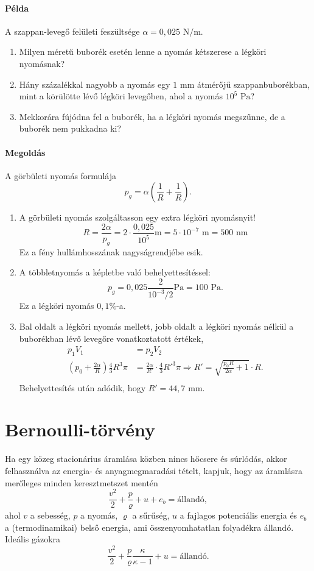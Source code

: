 \documentclass[12pt,a4paper]{scrartcl}
\begin{document}
\paragraph{Példa}
A szappan-levegő felületi feszültsége $\alpha = 0{,}025\text{ N}/\text{m}$. 
\begin{enumerate}
\item  Milyen méretű buborék esetén lenne a nyomás kétszerese a légköri nyomásnak? 
\item Hány százalékkal nagyobb a nyomás egy $1\text{ mm}$ átmérőjű szappanbuborékban, mint a körülötte lévő légköri levegőben, ahol a nyomás $10^5\text{ Pa}$?
\item Mekkorára fújódna fel a buborék, ha a légköri nyomás megszűnne, de a buborék nem pukkadna ki?
\end{enumerate}

\paragraph{Megoldás}
A görbületi nyomás formulája
\[{p_g} = \alpha \left( {\frac{1}{R} + \frac{1}{R}} \right).\]
\begin{enumerate}
\item A görbületi nyomás szolgáltasson egy extra légköri nyomásnyit!
\[R = \frac{{2\alpha }}{p_g} = 2 \cdot \frac{{0{,}025}}{{{{10}^5}}}{\text{m}} = 5 \cdot {10^{ - 7}}{\text{ m}} = 500{\text{ nm}}\]
Ez a fény hullámhosszának nagyságrendjébe esik.
\item A többletnyomás a képletbe való behelyettesítéssel:
\[{p_g} = 0{,}025\frac{2}{{{{10}^{ - 3}}/2}}{\text{Pa}} = 100{\text{ Pa}}.\]
Ez a légköri nyomás $0{,}1\%$-a.
\item Bal oldalt a légköri nyomás mellett, jobb oldalt a légköri nyomás nélkül a buborékban lévő levegőre vonatkoztatott értékek, 
\[\begin{aligned}
  {p_1}{V_1} &  = {p_2}{V_2} \\ 
  \left( {{p_0} + \frac{{2\alpha }}{R}} \right)\frac{4}{3}{R^3}\pi  &  = \frac{{2\alpha }}{{R'}} \cdot \frac{4}{3}R{'^3}\pi  \Rightarrow R' = \sqrt {\frac{{{p_0}R}}{{2\alpha }} + 1}  \cdot R. \\ 
\end{aligned} \]
Behelyettesítés után adódik, hogy $R' = 44{,}7{\text{ mm}}$.
\end{enumerate}
\normalsize

\section{Bernoulli-törvény}
Ha egy közeg stacionárius áramlása közben nincs hőcsere és súrlódás, akkor felhasználva az energia- és anyagmegmaradási tételt, kapjuk, hogy az áramlásra merőleges minden keresztmetszet mentén
\begin{equation} \label{eq:bernulli}
\frac{{{v^2}}}{2} + \frac{p}{\varrho } + u + {e_b} = {\text{állandó}},
\end{equation}
ahol $v$ a sebesség, $p$ a nyomás, $\varrho$ a sűrűség, $u$ a fajlagos potenciális energia és $e_b$ a (termodinamikai) belső energia, ami összenyomhatatlan folyadékra állandó. Ideális gázokra
\[\frac{{{v^2}}}{2} + \frac{p}{\varrho }\frac{\kappa }{{\kappa  - 1}} + u = {\text{állandó.}}\]
\end{document}
